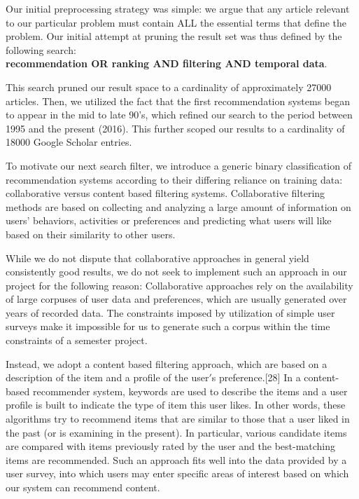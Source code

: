 \documentclass{sig-alternate-05-2015}
\begin{document}
Our initial preprocessing strategy was simple: we argue that any article relevant to our particular problem must contain ALL the essential terms that define the problem. Our initial attempt at pruning the result set was thus defined by the following search:\\ \textbf{recommendation OR ranking AND filtering AND temporal data}.

This search pruned our result space to a cardinality of approximately 27000 articles. Then, we utilized the fact that the first recommendation systems began to appear in the mid to late 90's, which refined our search to the period between 1995 and the present (2016). This further scoped our results to a cardinality of 18000 Google Scholar entries.

To motivate our next search filter, we introduce a generic binary classification of recommendation systems according to their differing reliance on training data: collaborative versus content based filtering systems\cite{13}. Collaborative filtering methods are based on collecting and analyzing a large amount of information on users$’$ behaviors, activities or preferences and predicting what users will like based on their similarity to other users.

While we do not dispute that collaborative approaches in general yield consistently good results, we do not seek to implement such an approach in our project for the following reason: Collaborative approaches rely on the availability of large corpuses of user data and preferences, which are usually generated over years of recorded data. The constraints imposed by utilization of simple user surveys make it impossible for us to generate such a corpus within the time constraints of a semester project. 

Instead, we adopt a content based filtering approach\cite{13}, which are based on a description of the item and a profile of the user$'$s preference.[28] In a content-based recommender system, keywords are used to describe the items and a user profile is built to indicate the type of item this user likes. In other words, these algorithms try to recommend items that are similar to those that a user liked in the past (or is examining in the present). In particular, various candidate items are compared with items previously rated by the user and the best-matching items are recommended. Such an approach fits well into the data provided by a user survey, into which users may enter specific areas of interest based on which our system can recommend content.
\end{document}
